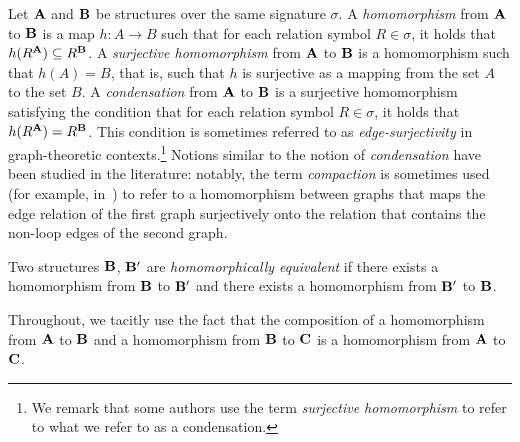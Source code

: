 \documentclass[11pt]{article}
\begin{document}
Let $\mathbf{A}$ and $\mathbf{B}$ be structures over the same signature $\sigma$.
A \emph{homomorphism} from $\mathbf{A}$ to $\mathbf{B}$
is a map $h: A \to B$ such that
for each relation symbol $R \in \sigma$,
it holds that $h(R^{\mathbf{A}}) \subseteq R^{\mathbf{B}}$.
A \emph{surjective homomorphism} from $\mathbf{A}$ to $\mathbf{B}$
is a homomorphism such that $h(A) = B$, that is, 
such that $h$ is surjective
as a mapping from the set $A$ to the set $B$.
A \emph{condensation} from $\mathbf{A}$ to $\mathbf{B}$
is a surjective homomorphism satisfying the condition that
for each relation symbol $R \in \sigma$,
it holds that $h(R^{\mathbf{A}}) = R^{\mathbf{B}}$.
This condition is sometimes referred to as \emph{edge-surjectivity}
in graph-theoretic contexts.\footnote{
We remark that some authors use the term \emph{surjective homomorphism}
to refer to what we refer to as a condensation.}
Notions similar to the notion of \emph{condensation}
have been studied in the literature: 
notably, the term \emph{compaction} is sometimes used 
(for example, in~\cite{FockeGoldbergZivny17-counting-surjhoms-and-compactions})
to refer to
a homomorphism between graphs that maps the edge
relation of the first graph surjectively onto
the relation that contains the non-loop edges of the second graph.


Two structures $\mathbf{B}$, $\mathbf{B}'$ are \emph{homomorphically equivalent}
if there exists a homomorphism from $\mathbf{B}$ to $\mathbf{B}'$
and
there exists a homomorphism from $\mathbf{B}'$ to $\mathbf{B}$.

Throughout, we tacitly use the fact that the composition of
a homomorphism from $\mathbf{A}$ to $\mathbf{B}$
and a homomorphism from $\mathbf{B}$ to $\mathbf{C}$
is a homomorphism from $\mathbf{A}$ to $\mathbf{C}$.


\begin{comment}
By an \emph{atom}, we refer to a formula of the form
$R(v_1, \ldots, v_k)$ where $R$ is a relation symbol, $k = \ar(R)$,
and the $v_i$ are variables;
by a \emph{variable equality}, we refer to a formula of the form
$u = v$ where $u$ and $v$ are variables.
A \emph{pp-formula} (short for \emph{primitive positive formula})
is a formula built using atoms, variable equalities, 
conjunction $(\wedge)$, and existential quantification $(\exists)$.
A \emph{quantifier-free pp-formula} is a pp-formula that does not
contain existential quantification, that is, a pp-formula
that is a conjunction of atoms and variable equalities.
A relation $P \subseteq B^m$ 
is \emph{pp-definable} over a structure $\relb$
if there exists a pp-formula $\psi(x_1, \ldots, x_m)$
such that a tuple $(b_1, \ldots, b_m)$ is in $P$
if and only if $\relb, b_1, \ldots, b_m \models \psi$;
when such a pp-formula exists, it is called 
a \emph{pp-definition} of $P$ over $\relb$.
\end{comment}
\end{document}
